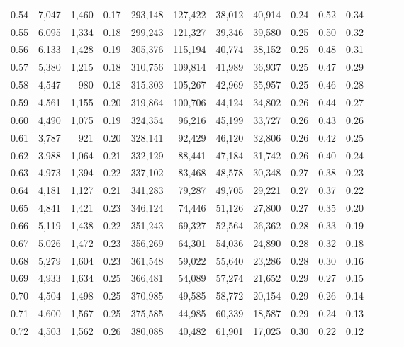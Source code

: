 \begin{tabular}{rrrrrrrrrrrrrr}
0.54 &  7,047 &  1,460 &  0.17 &  293,148 &  127,422 &  38,012 &  40,914 &  0.24 &  0.52 &      0.34 \\
0.55 &  6,095 &  1,334 &  0.18 &  299,243 &  121,327 &  39,346 &  39,580 &  0.25 &  0.50 &      0.32 \\
0.56 &  6,133 &  1,428 &  0.19 &  305,376 &  115,194 &  40,774 &  38,152 &  0.25 &  0.48 &      0.31 \\
0.57 &  5,380 &  1,215 &  0.18 &  310,756 &  109,814 &  41,989 &  36,937 &  0.25 &  0.47 &      0.29 \\
0.58 &  4,547 &    980 &  0.18 &  315,303 &  105,267 &  42,969 &  35,957 &  0.25 &  0.46 &      0.28 \\
0.59 &  4,561 &  1,155 &  0.20 &  319,864 &  100,706 &  44,124 &  34,802 &  0.26 &  0.44 &      0.27 \\
0.60 &  4,490 &  1,075 &  0.19 &  324,354 &   96,216 &  45,199 &  33,727 &  0.26 &  0.43 &      0.26 \\
0.61 &  3,787 &    921 &  0.20 &  328,141 &   92,429 &  46,120 &  32,806 &  0.26 &  0.42 &      0.25 \\
0.62 &  3,988 &  1,064 &  0.21 &  332,129 &   88,441 &  47,184 &  31,742 &  0.26 &  0.40 &      0.24 \\
0.63 &  4,973 &  1,394 &  0.22 &  337,102 &   83,468 &  48,578 &  30,348 &  0.27 &  0.38 &      0.23 \\
0.64 &  4,181 &  1,127 &  0.21 &  341,283 &   79,287 &  49,705 &  29,221 &  0.27 &  0.37 &      0.22 \\
0.65 &  4,841 &  1,421 &  0.23 &  346,124 &   74,446 &  51,126 &  27,800 &  0.27 &  0.35 &      0.20 \\
0.66 &  5,119 &  1,438 &  0.22 &  351,243 &   69,327 &  52,564 &  26,362 &  0.28 &  0.33 &      0.19 \\
0.67 &  5,026 &  1,472 &  0.23 &  356,269 &   64,301 &  54,036 &  24,890 &  0.28 &  0.32 &      0.18 \\
0.68 &  5,279 &  1,604 &  0.23 &  361,548 &   59,022 &  55,640 &  23,286 &  0.28 &  0.30 &      0.16 \\
0.69 &  4,933 &  1,634 &  0.25 &  366,481 &   54,089 &  57,274 &  21,652 &  0.29 &  0.27 &      0.15 \\
0.70 &  4,504 &  1,498 &  0.25 &  370,985 &   49,585 &  58,772 &  20,154 &  0.29 &  0.26 &      0.14 \\
0.71 &  4,600 &  1,567 &  0.25 &  375,585 &   44,985 &  60,339 &  18,587 &  0.29 &  0.24 &      0.13 \\
0.72 &  4,503 &  1,562 &  0.26 &  380,088 &   40,482 &  61,901 &  17,025 &  0.30 &  0.22 &      0.12 \\

\end{tabular}
